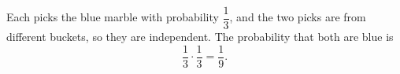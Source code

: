 Each picks the blue marble with probability $\dfrac{1}{3}$, and the two picks are from different buckets, so they are independent. The probability that both are blue is
\[
\dfrac{1}{3}\cdot\dfrac{1}{3}=\boxed{\dfrac{1}{9}}.
\]
